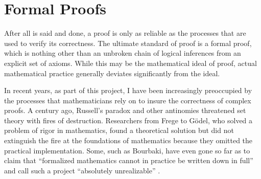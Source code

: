 \section*{Formal Proofs}

After all is said and done, a proof is only as reliable as the
processes that are used to verify its correctness.  The ultimate
standard of proof is a formal proof, which is nothing other
than an unbroken chain of logical inferences from an explicit set of
axioms.  While this may be the mathematical ideal of proof, actual
mathematical practice generally deviates significantly from the ideal.



%
%
%
%

In recent years, as part of this project, I have been increasingly preoccupied by the
processes that mathematicians rely on to insure the correctness of complex
proofs. A century ago, Russell's paradox and other antinomies threatened
 set theory  with fires of destruction.
Researchers from Frege to G\"odel, who solved a problem of
rigor in mathematics, found a theoretical solution but did not
extinguish the fire at the foundations of mathematics
because they omitted the practical implementation. Some, such as
Bourbaki, have even gone so far as to claim that ``formalized
mathematics cannot in practice be written down in full'' and call
such a project
``absolutely unrealizable'' \cite[pp.~10--11]{Bour:68:Sets}. %

